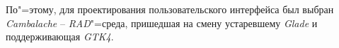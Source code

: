 \documentclass[variant=courcework]{bsuir}
\begin{document}
По"=этому, для проектирования пользовательского интерфейса был выбран
\textit{Cambalache} -- \textit{RAD}"=среда, пришедшая на смену устаревшему
\textit{Glade} и поддерживающая \textit{GTK4}.











\end{document}
